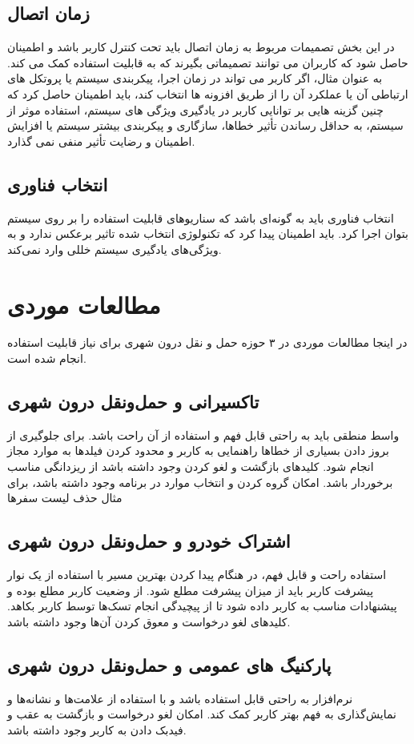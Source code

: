 \subsection{زمان اتصال}
در این بخش تصمیمات مربوط به زمان  اتصال باید تحت کنترل کاربر باشد و اطمینان حاصل شود که کاربران می توانند تصمیماتی بگیرند که به قابلیت استفاده کمک می کند.
به عنوان مثال، اگر کاربر می تواند در زمان اجرا، پیکربندی سیستم یا پروتکل های ارتباطی آن یا عملکرد آن را از طریق افزونه ها انتخاب کند، باید اطمینان حاصل کرد که چنین گزینه هایی بر توانایی کاربر در یادگیری ویژگی های سیستم، استفاده موثر از سیستم، به حداقل رساندن تأثیر خطاها، سازگاری و پیکربندی بیشتر سیستم یا افزایش اطمینان و رضایت 
تأثیر منفی نمی گذارد.
\subsection{انتخاب فناوری}
انتخاب فناوری باید به گونه‌ای باشد که سناریو‌های قابلیت استفاده را بر روی سیستم بتوان اجرا کرد.
باید اطمینان پیدا کرد که تکنولوژی انتخاب شده تاثیر برعکس ندارد و به ویژگی‌های یادگیری سیستم خللی وارد نمی‌کند. 


\section{مطالعات موردی}
در اینجا مطالعات موردی در ۳ حوزه حمل و نقل درون شهری برای نیاز قابلیت استفاده انجام شده است. 
\subsection{تاکسیرانی و حمل‌و‌نقل درون شهری}
واسط منطقی باید به راحتی قابل فهم و استفاده از آن راحت باشد. برای جلوگیری از بروز دادن بسیاری از خطاها  راهنمایی به کاربر و محدود کردن فیلدها به موارد مجاز انجام شود.
کلیدهای بازگشت و لغو کردن وجود داشته باشد از ریزدانگی مناسب برخوردار باشد. امکان گروه کردن و انتخاب موارد در برنامه وجود داشته باشد، برای مثال حذف لیست سفرها

\subsection{اشتراک خودرو و حمل‌و‌نقل درون شهری}
استفاده راحت و قابل فهم، در هنگام پیدا کردن بهترین مسیر با استفاده از یک نوار پیشرفت کاربر باید از میزان پیشرفت مطلع شود. از وضعیت کاربر مطلع بوده و پیشنهادات مناسب به کاربر داده شود تا از پیچیدگی انجام تسک‌ها توسط کاربر بکاهد. کلیدهای لغو درخواست و معوق کردن آن‌ها وجود داشته باشد.
\subsection{پارکنیگ های عمومی و حمل‌و‌نقل درون شهری}
نرم‌افزار به راحتی قابل استفاده باشد و با استفاده از علامت‌ها و نشانه‌ها و نمایش‌گذاری به فهم بهتر کاربر کمک کند. امکان لغو درخواست و بازگشت به عقب و فیدبک دادن به کاربر وجود داشته باشد.